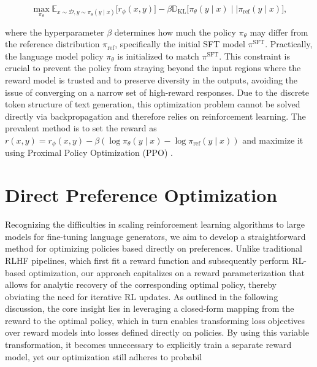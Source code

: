 \begin{equation}\label{eq:RL}
\max_{\pi_{\theta}}  \mathbb{E}_{x\sim \mathcal{D}, y\sim \pi_{\theta}(y \mid x)}\bigl[r_{\phi}(x, y)\bigr] - \beta\mathbb{D}_{\textrm{KL}}\bigl[\pi_{\theta}(y\mid x)\mid \mid \pi_\text{ref}(y\mid x)\bigr],
\end{equation}

where the hyperparameter $\beta$ determines how much the policy $\pi_{\theta}$ may differ from the reference distribution $\pi_\text{ref}$, specifically the initial SFT model $\pi^\text{SFT}$. 
Practically, the language model policy $\pi_\theta$ is initialized to match $\pi^\text{SFT}$. This constraint is crucial to prevent the policy from straying beyond the input regions where the reward model is trusted and to preserve diversity in the outputs, avoiding the issue of converging on a narrow set of high-reward responses. Due to the discrete token structure of text generation, this optimization problem cannot be solved directly via backpropagation and therefore relies on reinforcement learning. The prevalent method \citep{ziegler2020finetuning, stiennon2022learning, bai2022training, ouyang2022training} is to set the reward as ${r(x, y) = r_{\phi}(x, y) -\beta (\log \pi_{\theta}(y\mid x) - \log \pi_\text{ref}(y\mid x))}$ and maximize it using Proximal Policy Optimization (PPO) \cite{schulman2017proximal}.

\section{Direct Preference Optimization}\label{sec:DPO}

Recognizing the difficulties in scaling reinforcement learning algorithms to large models for fine-tuning language generators, we aim to develop a straightforward method for optimizing policies based directly on preferences. Unlike traditional RLHF pipelines, which first fit a reward function and subsequently perform RL-based optimization, our approach capitalizes on a reward parameterization that allows for analytic recovery of the corresponding optimal policy, thereby obviating the need for iterative RL updates. As outlined in the following discussion, the core insight lies in leveraging a closed-form mapping from the reward to the optimal policy, which in turn enables transforming loss objectives over reward models into losses defined directly on policies. By using this variable transformation, it becomes unnecessary to explicitly train a separate reward model, yet our optimization still adheres to probabil

